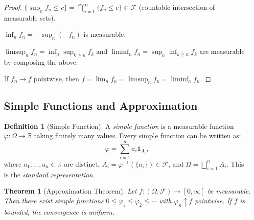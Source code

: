 \documentclass[11pt,a4paper]{article}
\theoremstyle{definition}
\newtheorem{definition}{Definition}[section]
\theoremstyle{plain}
\newtheorem{theorem}{Theorem}[section]
\theoremstyle{remark}
\newcommand{\R}{\mathbb{R}}
\newcommand{\indicator}{\mathbf{1}}
\begin{document}
\begin{proof}
$\{\sup_n f_n \leq c\} = \bigcap_{n=1}^\infty \{f_n \leq c\} \in \mathcal{F}$ (countable intersection of measurable sets).

$\inf_n f_n = -\sup_n(-f_n)$ is measurable.

$\limsup_n f_n = \inf_n \sup_{k \geq n} f_k$ and $\liminf_n f_n = \sup_n \inf_{k \geq n} f_k$ are measurable by composing the above.

If $f_n \to f$ pointwise, then $f = \lim_n f_n = \limsup_n f_n = \liminf_n f_n$.
\end{proof}

\subsection{Simple Functions and Approximation}
\label{subsec:simple}

\begin{definition}[Simple Function]
\label{def:simple}
A \emph{simple function} is a measurable function $\varphi: \Omega \to \R$ taking
finitely many values. Every simple function can be written as:
\begin{equation}
    \varphi = \sum_{i=1}^n a_i \indicator_{A_i},
    \label{eq:simple}
\end{equation}
where $a_1, \ldots, a_n \in \R$ are distinct, $A_i = \varphi^{-1}(\{a_i\}) \in \mathcal{F}$,
and $\Omega = \bigsqcup_{i=1}^n A_i$. This is the \emph{standard representation}.
\end{definition}

\begin{keyresult}
\begin{theorem}[Approximation Theorem]
\label{thm:approximation}
Let $f: (\Omega, \mathcal{F}) \to [0, \infty]$ be measurable. Then there exist
simple functions $0 \leq \varphi_1 \leq \varphi_2 \leq \cdots$ with $\varphi_n \uparrow f$
pointwise. If $f$ is bounded, the convergence is uniform.
\end{theorem}
\end{keyresult}
\end{document}
